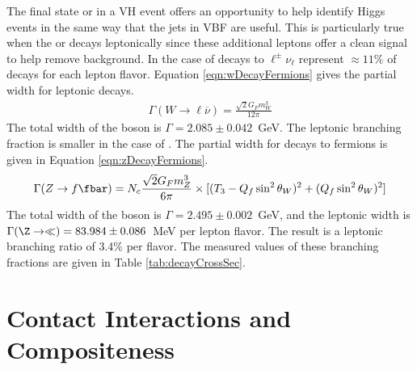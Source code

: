 The final state \W or \Z in a VH event offers an opportunity to help identify Higgs events in the same way that the jets in VBF are useful.
This is particularly true when the \W or \Z decays leptonically since these additional leptons offer a clean signal to help remove background.
In the case of \W decays to $\ell^\pm\nu_\ell$ represent $\approx11\%$ of decays for each lepton flavor.
Equation \ref{eqn:wDecayFermions} gives the partial width for leptonic \W decays.
\begin{equation}\begin{split}\label{eqn:wDecayFermions}
    \Gamma(W\to\ell\overline{\nu})=\frac{\sqrt{2}G_Fm_W^3}{12\pi}
\end{split}\end{equation} 
The total width of the \W boson is $\Gamma=2.085\pm0.042$~GeV.
The leptonic branching fraction is smaller in the case of \Z.
The partial width for \Z decays to fermions is given in Equation \ref{eqn:zDecayFermions}.
\begin{equation}\begin{split}\label{eqn:zDecayFermions}
    \Gamma(Z\to f\fbar)=N_c\frac{\sqrt{2}G_Fm_Z^3}{6\pi}\times[(T_3-Q_f\sin^2\theta_W)^2+(Q_f\sin^2\theta_W)^2]
\end{split}\end{equation} 
The total width of the \Z boson is $\Gamma=2.495\pm0.002$~GeV, and the leptonic width is $\Gamma(\Z\to\ll)=83.984\pm0.086$~MeV per lepton flavor.
The result is a leptonic branching ratio of 3.4\% per flavor. \cite{pdg2018}
The measured values of these branching fractions are given in Table \ref{tab:decayCrossSec}.

\section{Contact Interactions and Compositeness}

